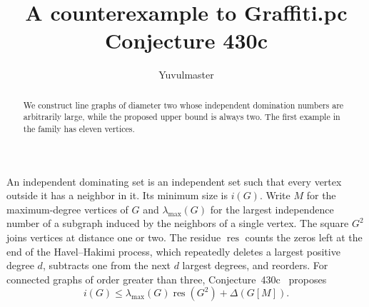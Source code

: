 \documentclass[10pt,letterpaper]{amsart}
\title{A counterexample to Graffiti.pc Conjecture 430c}
\author{Yuvulmaster}
\date{}
\begin{document}
\begin{abstract}
We construct line graphs of diameter two whose independent domination numbers are arbitrarily large, while the proposed upper bound is always two. The first example in the family has eleven vertices.
\end{abstract}
\maketitle
An independent dominating set is an independent set such that every vertex
outside it has a neighbor in it. Its minimum size is $i(G)$. Write $M$ for
the maximum-degree vertices of $G$ and $\lambda_{\max}(G)$ for the largest
independence number of a subgraph induced by the neighbors of a single
vertex. The square $G^2$ joins vertices at distance one or two. The
residue $\operatorname{res}$ counts the zeros left at the end of the
Havel--Hakimi process, which repeatedly deletes a largest positive degree
$d$, subtracts one from the next $d$ largest degrees, and reorders.
For connected graphs of order greater than three, Conjecture~430c~\cite{wall}
proposes
\[
 i(G)\le \lambda_{\max}(G)\operatorname{res}(G^2)+\Delta(G[M]).
\]
\end{document}
